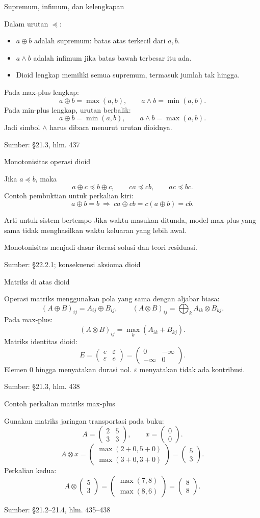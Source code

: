 \documentclass[aspectratio=169,11pt]{beamer}
\newcommand{\source}[1]{%
    \vfill
    \hfill{\tiny\color{gray}Sumber: #1}
}
\newcommand{\eps}{\varepsilon}
\newcommand{\mpmat}[1]{\begin{pmatrix}#1\end{pmatrix}}
\begin{document}
\begin{frame}{Supremum, infimum, dan kelengkapan}

Dalam urutan $\preceq$:
\begin{itemize}
\item $a\oplus b$ adalah supremum: batas atas terkecil dari $a,b$.
\item $a\wedge b$ adalah infimum jika batas bawah terbesar itu ada.
\item Dioid lengkap memiliki semua supremum, termasuk jumlah tak hingga.
\end{itemize}
Pada max-plus lengkap:
\[
a\oplus b=\max(a,b),\qquad a\wedge b=\min(a,b).
\]
Pada min-plus lengkap, urutan berbalik:
\[
a\oplus b=\min(a,b),\qquad a\wedge b=\max(a,b).
\]
Jadi simbol $\wedge$ harus dibaca menurut urutan dioidnya.

\source{\S21.3, hlm. 437}
\end{frame}
\begin{frame}{Monotonisitas operasi dioid}

Jika $a\preceq b$, maka
\[
a\oplus c\preceq b\oplus c,\qquad
ca\preceq cb,\qquad ac\preceq bc.
\]
Contoh pembuktian untuk perkalian kiri:
\[
a\oplus b=b
\ \Longrightarrow\
ca\oplus cb=c(a\oplus b)=cb.
\]
\begin{block}{Arti untuk sistem bertempo}
Jika waktu masukan ditunda, model max-plus yang sama tidak menghasilkan
waktu keluaran yang lebih awal.
\end{block}
Monotonisitas menjadi dasar iterasi solusi dan teori residuasi.

\source{\S22.2.1; konsekuensi aksioma dioid}
\end{frame}
\begin{frame}{Matriks di atas dioid}


Operasi matriks menggunakan pola yang sama dengan aljabar biasa:
\[
(A\oplus B)_{ij}=A_{ij}\oplus B_{ij},\qquad
(A\otimes B)_{ij}=\bigoplus_k A_{ik}\otimes B_{kj}.
\]
Pada max-plus:
\[
(A\otimes B)_{ij}=\max_k(A_{ik}+B_{kj}).
\]
Matriks identitas dioid:
\[
E=\mpmat{e&\eps\\\eps&e}
=\mpmat{0&-\infty\\-\infty&0}.
\]
Elemen $0$ hingga menyatakan durasi nol. $\eps$ menyatakan tidak ada kontribusi.

\source{\S21.3, hlm. 438}

\end{frame}
\begin{frame}{Contoh perkalian matriks max-plus}


Gunakan matriks jaringan transportasi pada buku:
\[
A=\mpmat{2&5\\3&3},\qquad x=\mpmat{0\\0}.
\]
\[
A\otimes x=
\mpmat{\max(2+0,5+0)\\\max(3+0,3+0)}
=\mpmat{5\\3}.
\]
Perkalian kedua:
\[
A\otimes\mpmat{5\\3}
=\mpmat{\max(7,8)\\\max(8,6)}
=\mpmat{8\\8}.
\]

\source{\S21.2--21.4, hlm. 435--438}

\end{frame}
\end{document}
